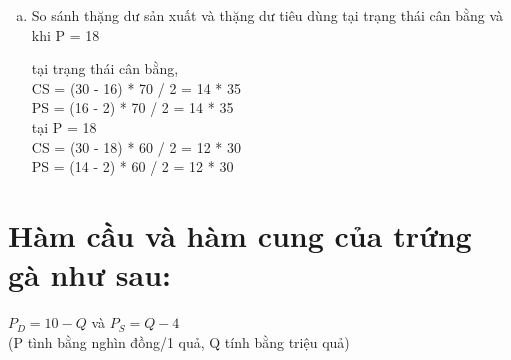 \begin{enumerate}[a.]
\begin{tikzpicture}
   
  \end{tikzpicture}

  \item So sánh thặng dư sản xuất và thặng dư tiêu dùng tại trạng thái cân bằng và khi P = 18
  
   tại trạng thái cân bằng,\\
    CS = (30 - 16) * 70 / 2 = 14 * 35 \\
    PS = (16 - 2) * 70 / 2 = 14 * 35 \\
  tại P = 18 \\
  CS = (30 - 18) * 60 / 2 = 12 * 30 \\
  PS = (14 - 2) * 60 / 2 = 12 * 30 \\
  

\end{enumerate}

\section{Hàm cầu và hàm cung của trứng gà như sau:}

$P_D = 10 - Q$ và $ P_S = Q - 4$ \\
(P tình bằng nghìn đồng/1 quả, Q tính bằng triệu quả)


